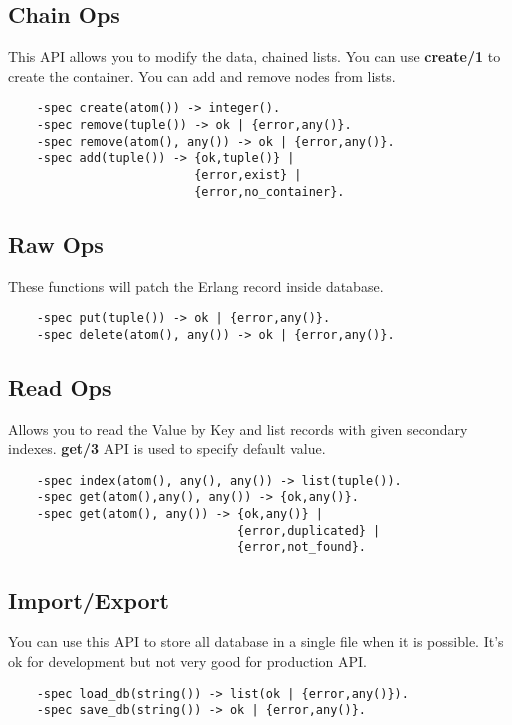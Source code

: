 \subsection{Chain Ops}
This API allows you to modify the data, chained lists.
You can use {\bf create/1} to create the container.
You can add and remove nodes from lists.

\vspace{1\baselineskip}
\begin{lstlisting}
    -spec create(atom()) -> integer().
    -spec remove(tuple()) -> ok | {error,any()}.
    -spec remove(atom(), any()) -> ok | {error,any()}.
    -spec add(tuple()) -> {ok,tuple()} |
                          {error,exist} |
                          {error,no_container}.
\end{lstlisting}
\vspace{1\baselineskip}

\subsection{Raw Ops}
These functions will patch the Erlang record inside database.

\vspace{1\baselineskip}
\begin{lstlisting}
    -spec put(tuple()) -> ok | {error,any()}.
    -spec delete(atom(), any()) -> ok | {error,any()}.
\end{lstlisting}
\vspace{1\baselineskip}

\subsection{Read Ops}
Allows you to read the Value by Key and list records with given secondary indexes.
{\bf get/3} API is used to specify default value.

\vspace{1\baselineskip}
\begin{lstlisting}
    -spec index(atom(), any(), any()) -> list(tuple()).
    -spec get(atom(),any(), any()) -> {ok,any()}.
    -spec get(atom(), any()) -> {ok,any()} |
                                {error,duplicated} |
                                {error,not_found}.
\end{lstlisting}
\vspace{1\baselineskip}

\subsection{Import/Export}
You can use this API to store all database
in a single file when it is possible. It's ok for development but not very good for production API.

\vspace{1\baselineskip}
\begin{lstlisting}
    -spec load_db(string()) -> list(ok | {error,any()}).
    -spec save_db(string()) -> ok | {error,any()}.
\end{lstlisting}
\vspace{1\baselineskip}
